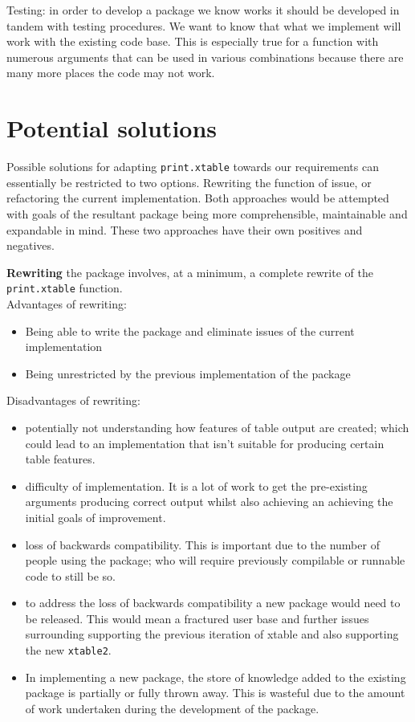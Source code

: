 \documentclass{memoir}\usepackage[]{graphicx}\usepackage[]{color}
\makeatletter
\def\namedlabel#1#2{\begingroup
    #2%
    \def\@currentlabel{#2}%
    \phantomsection\label{#1}\endgroup
}
\newcommand{\pkg}[1]{{\fontseries{b}\selectfont #1}}
\let\code=\texttt
\makeatother
\begin{document}
\begin{description}[style=multiline, labelwidth=2cm]
	\item[\namedlabel{itm:p7}{testing}] Testing: in order to develop a package we know works it should be developed in tandem with testing procedures.\cite{testthat} We want to know that what we implement will work with the existing code base. This is especially true for a function with numerous arguments that can be used in various combinations because there are many more places the code may not work.
\end{description}


\section{Potential solutions}

Possible solutions for adapting \code{print.xtable} towards our requirements can essentially be restricted to two options. Rewriting the function of issue, or refactoring the current implementation. Both approaches would be attempted with goals of the resultant package being more comprehensible, maintainable and expandable in mind. These two approaches have their own positives and negatives.

\vspace{4mm}

\textbf{Rewriting} the package involves, at a minimum, a complete rewrite of the \code{print.xtable} function.\\

\noindent Advantages of rewriting:
\begin{itemize}
\item Being able to write the package and eliminate issues of the current implementation
\item Being unrestricted by the previous implementation of the package
\end{itemize}
Disadvantages of rewriting:
\begin{itemize}
\item potentially not understanding how features of table output are created; which could lead to an implementation that isn't suitable for producing certain table features.
\item difficulty of implementation. It is a lot of work to get the pre-existing arguments producing correct output whilst also achieving an achieving the initial goals of improvement. 
\item loss of backwards compatibility. This is important due to the number of people using the package; who will require previously compilable or runnable code to still be so.
\item to address the loss of backwards compatibility a new package would need to be released. This would mean a fractured user base and further issues surrounding supporting the previous iteration of \pkg{xtable} and also supporting the new \code{xtable2}.
\item In implementing a new package, the store of knowledge added to the existing package is partially or fully thrown away. This is wasteful due to the amount of work undertaken during the development of the package.
\end{itemize}
\end{document}
